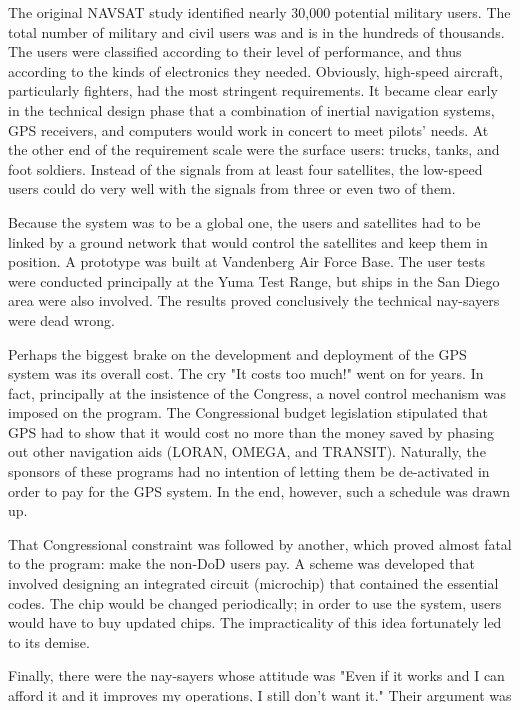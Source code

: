The original NAVSAT study identified nearly 30,000 potential military users. The total number of military and civil users was and is in the hundreds of thousands. The users were classified according to their level of performance, and thus according to the kinds of electronics they needed. Obviously, high-speed aircraft, particularly fighters, had the most stringent requirements. It became clear early in the technical design phase that a combination of inertial navigation systems, GPS receivers, and computers would work in concert to meet pilots' needs. At the other end of the requirement scale were the surface users: trucks, tanks, and foot soldiers. Instead of the signals from at least four satellites, the low-speed users could do very well with the signals from three or even two of them.

Because the system was to be a global one, the users and satellites had to be linked by a ground network that would control the satellites and keep them in position. A prototype was built at Vandenberg Air Force Base. The user tests were conducted principally at the Yuma Test Range, but ships in the San Diego area were also involved. The results proved conclusively the technical nay-sayers were dead wrong.

Perhaps the biggest brake on the development and deployment of the GPS system was its overall cost. The cry "It costs too much!" went on for years. In fact, principally at the insistence of the Congress, a novel control mechanism was imposed on the program. The Congressional budget legislation stipulated that GPS had to show that it would cost no more than the money saved by phasing out other navigation aids (LORAN, OMEGA, and TRANSIT). Naturally, the sponsors of these programs had no intention of letting them be de-activated in order to pay for the GPS system. In the end, however, such a schedule was drawn up.

That Congressional constraint was followed by another, which proved almost fatal to the program: make the non-DoD users pay. A scheme was developed that involved designing an integrated circuit (microchip) that contained the essential codes. The chip would be changed periodically; in order to use the system, users would have to buy updated chips. The impracticality of this idea fortunately led to its demise.

Finally, there were the nay-sayers whose attitude was "Even if it works and I can afford it and it improves my operations, I still don't want it." Their argument was that satellites would always be vulnerable, and therefore the GPS system could operate only in peacetime. They had no intention of depending on it for military operations. To meet this objection, the constellation was changed so that the satellites were deployed in six planes, with three satellites per plane and three others on orbit. The satellites would be hardened to resist the effects of radiation. Last, three other satellites were to be procured to replace any birds that were lost for any reason, including hostilities or direct attacks.

